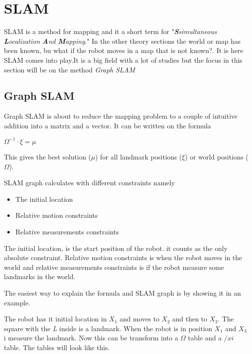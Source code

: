 \chapter{SLAM}
\label{chp:slam}

SLAM is a method for mapping and it a short term for "\emph{\textbf{S}simultaneous \textbf{L}ocalization \textbf{A}nd \textbf{M}apping}."
In the other theory sections the world or map has been known, bu what if the robot moves in a map that is not known?. It is here SLAM comes into play.It is a big field with a lot of studies but the focus in this section will be on the method \emph{Graph SLAM}

\section{Graph SLAM}

Graph SLAM is about to reduce the mapping problem to a couple of intuitive addition into a matrix and a vector.
It can be written on the formula

\begin{center}
	$\Omega^{-1} \cdot \xi = \mu$
\end{center}

This gives the best solution ($\mu$) for all landmark positions ($\xi$) or world positions ($\Omega$).

SLAM graph calculates with different constraints namely

\begin{itemize}
	\item The initial location
	\item Relative motion constraints
	\item Relative measurements constraints
\end{itemize}

The initial location, is the start position of the robot. it counts as the only absolute constraint. Relative motion constraints is when the robot moves in the world and relative measurements constraints is if the robot measure some landmarks in the world.

The easiest way to explain the formula and SLAM graph is by showing it in an example.

 
The robot has it initial location in $X_1$ and moves to $X_2$ and then to $X_3$. The square with the \emph{L} inside is a landmark. When the robot is in position $X_1$ and $X_3$ i measure the landmark.
Now this can be transform into a $\Omega$ table and a $/xi$ table. The tables will look like this.

